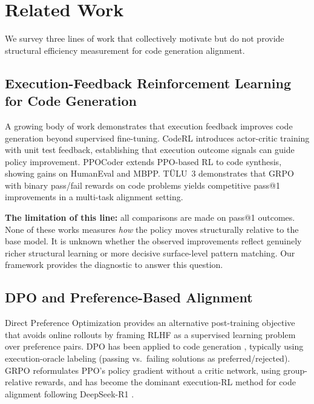 \section{Related Work}
\label{sec:related}

We survey three lines of work that collectively motivate but do not provide
structural efficiency measurement for code generation alignment.

\subsection{Execution-Feedback Reinforcement Learning for Code Generation}

A growing body of work demonstrates that execution feedback improves code
generation beyond supervised fine-tuning. CodeRL \cite{Le2022CodeRL} introduces
actor-critic training with unit test feedback, establishing that execution
outcome signals can guide policy improvement. PPOCoder \cite{Shojaee2023Execution}
extends PPO-based RL to code synthesis, showing gains on HumanEval and MBPP.
T\"{U}LU~3 \cite{Lambert2024TULU} demonstrates that GRPO with binary pass/fail
rewards on code problems yields competitive pass@1 improvements in a
multi-task alignment setting.

\textbf{The limitation of this line:} all comparisons are made on pass@1 outcomes.
None of these works measures \emph{how} the policy moves structurally relative to
the base model. It is unknown whether the observed improvements reflect
genuinely richer structural learning or more decisive surface-level pattern
matching. Our framework provides the diagnostic to answer this question.

\subsection{DPO and Preference-Based Alignment}

Direct Preference Optimization \cite{Rafailov2023Direct} provides an alternative
post-training objective that avoids online rollouts by framing RLHF as a
supervised learning problem over preference pairs. DPO has been applied to
code generation \cite{Guo2024DeepSeek,Luo2023Execution}, typically using
execution-oracle labeling (passing vs.\ failing solutions as preferred/rejected).
GRPO \cite{Shao2024DeepSeekMath} reformulates PPO's policy gradient without a critic
network, using group-relative rewards, and has become the dominant execution-RL
method for code alignment following DeepSeek-R1 \cite{DeepSeekAI2025DeepSeek}.

